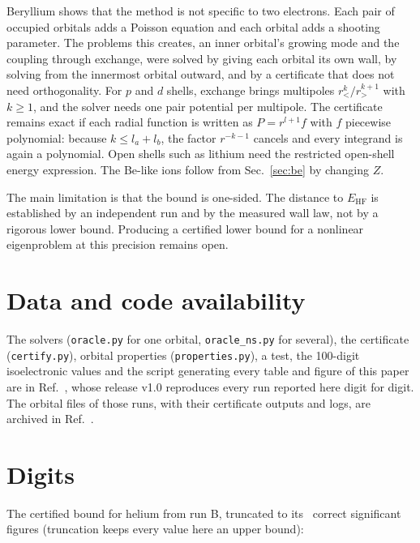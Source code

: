 \documentclass[aps,pra,reprint,superscriptaddress,amsmath,amssymb,longbibliography]{revtex4-2}
\newcommand{\EHF}{E_\mathrm{HF}}
\begin{document}
Beryllium shows that the method is not specific to two electrons. Each pair of occupied orbitals adds a Poisson equation and each orbital adds a shooting parameter. The problems this creates, an inner orbital's growing mode and the coupling through exchange, were solved by giving each orbital its own wall, by solving from the innermost orbital outward, and by a certificate that does not need orthogonality. For $p$ and $d$ shells, exchange brings multipoles $r_<^k/r_>^{k+1}$ with $k\ge1$, and the solver needs one pair potential per multipole. The certificate remains exact if each radial function is written as $P=r^{l+1}f$ with $f$ piecewise polynomial: because $k\le l_a+l_b$, the factor $r^{-k-1}$ cancels and every integrand is again a polynomial. Open shells such as lithium need the restricted open-shell energy expression. The Be-like ions follow from Sec.~\ref{sec:be} by changing $Z$.

The main limitation is that the bound is one-sided. The distance to $\EHF$ is established by an independent run and by the measured wall law, not by a rigorous lower bound. Producing a certified lower bound for a nonlinear eigenproblem at this precision remains open.

\section*{Data and code availability}
The solvers (\texttt{oracle.py} for one orbital, \texttt{oracle\_ns.py} for several), the certificate (\texttt{certify.py}), orbital properties (\texttt{properties.py}), a test, the 100-digit isoelectronic values and the script generating every table and figure of this paper are in Ref.~\cite{code}, whose release v1.0 reproduces every run reported here digit for digit. The orbital files of those runs, with their certificate outputs and logs, are archived in Ref.~\cite{data}.


\appendix
\section{Digits}\label{app:digits}

\begin{widetext}
The certified bound for helium from run B, truncated to its \Nsf\ correct significant figures (truncation keeps every value here an upper bound):

\end{widetext}
\end{document}
